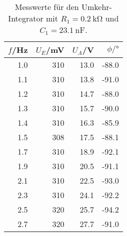 \begin{table}
  \centering
\begin{tabular}{rrrr}
  $f$/Hz &  $U_E$/mV &   $U_A$/V &  $\phi/\si{\degree}$ \\
\midrule
 1.0 &  310 &  13.0 & -88.0 \\
 1.1 &  310 &  13.8 & -91.0 \\
 1.2 &  310 &  14.7 & -88.0 \\
 1.3 &  310 &  15.7 & -90.0 \\
 1.4 &  310 &  16.3 & -85.9 \\
 1.5 &  308 &  17.5 & -88.1 \\
 1.7 &  310 &  18.9 & -92.1 \\
 1.9 &  310 &  20.5 & -91.1 \\
 2.1 &  310 &  22.5 & -93.0 \\
 2.3 &  310 &  24.1 & -92.2 \\
 2.5 &  320 &  25.7 & -94.2 \\
 2.7 &  320 &  27.7 & -91.0 \\
\end{tabular}
\caption{Messwerte für den Umkehr-Integrator mit $R_1 = \SI{0.2}{\kilo\ohm}$ und $C_1 = \SI{23.1}{\nano\farad}$.}
\end{table}
